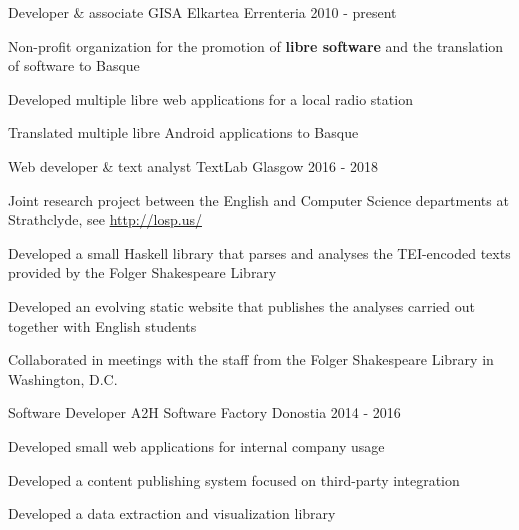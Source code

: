 \documentclass[11pt, a4paper]{awesome-cv}
\begin{document}
\begin{cventries}

    \cventry
      {Developer \& associate} %
      {GISA Elkartea} %
      {Errenteria} %
      {2010 - present} %
      {
        \begin{cvitems} %
        \item {Non-profit organization for the promotion of \textbf{libre
            software} and the translation of software to Basque}
          \item {Developed multiple libre web applications for a local radio
              station}
          \item {Translated multiple libre Android applications to Basque}
        \end{cvitems}
      }

    \cventry
      {Web developer \& text analyst} %
      {TextLab} %
      {Glasgow} %
      {2016 - 2018} %
      {
        \begin{cvitems} %
          \item {Joint research project between the English and Computer Science
              departments at Strathclyde, see \url{http://losp.us/}}
          \item {Developed a small Haskell library that parses and analyses the
              TEI-encoded texts provided by the Folger Shakespeare Library}
          \item {Developed an evolving static website that publishes the
              analyses carried out together with English students}
          \item {Collaborated in meetings with the staff from the Folger
              Shakespeare Library in Washington, D.C.}
        \end{cvitems}
      }

    \cventry
      {Software Developer} %
      {A2H Software Factory} %
      {Donostia} %
      {2014 - 2016} %
      {
        \begin{cvitems} %
          \item {Developed small web applications for internal company usage}
          \item {Developed a content publishing system focused on third-party
              integration}
          \item {Developed a data extraction and visualization library}
        \end{cvitems}
      }


\end{cventries}
\end{document}
